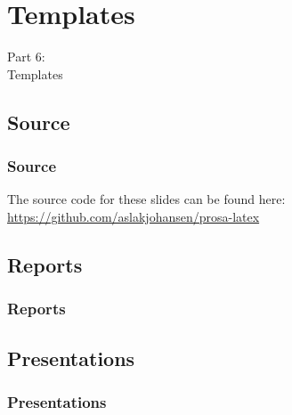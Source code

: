 {
\renewcommand{\bgcolor}{templates}

\section{Templates}
\begin{frame}
  \vspace{25mm}
  \begin{center}
    \Huge{Part 6:\\Templates}
  \end{center}
\end{frame}

\subsection{Source}
\begin{frame}[fragile]
  \frametitle{Source}
  \vspace{3mm}
  The source code for these slides can be found here: \url{https://github.com/aslakjohansen/prosa-latex}
\end{frame}

\subsection{Reports}
\begin{frame}[fragile]
  \frametitle{Reports}
  \vspace{3mm}
  
\end{frame}

\subsection{Presentations}
\begin{frame}[fragile]
  \frametitle{Presentations}
  \vspace{3mm}
  
\end{frame}

}


